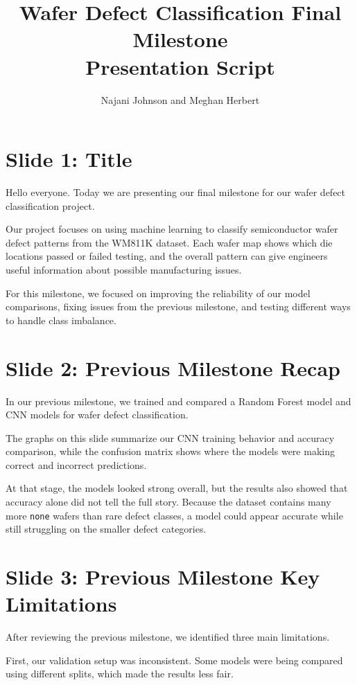 \documentclass[11pt]{article}
\title{Wafer Defect Classification Final Milestone\\Presentation Script}
\author{Najani Johnson and Meghan Herbert}
\date{}
\begin{document}
\maketitle

\section*{Slide 1: Title}

Hello everyone. Today we are presenting our final milestone for our wafer defect classification project.

Our project focuses on using machine learning to classify semiconductor wafer defect patterns from the WM811K dataset. Each wafer map shows which die locations passed or failed testing, and the overall pattern can give engineers useful information about possible manufacturing issues.

For this milestone, we focused on improving the reliability of our model comparisons, fixing issues from the previous milestone, and testing different ways to handle class imbalance.

\section*{Slide 2: Previous Milestone Recap}

In our previous milestone, we trained and compared a Random Forest model and CNN models for wafer defect classification.

The graphs on this slide summarize our CNN training behavior and accuracy comparison, while the confusion matrix shows where the models were making correct and incorrect predictions.

At that stage, the models looked strong overall, but the results also showed that accuracy alone did not tell the full story. Because the dataset contains many more \texttt{none} wafers than rare defect classes, a model could appear accurate while still struggling on the smaller defect categories.

\section*{Slide 3: Previous Milestone Key Limitations}

After reviewing the previous milestone, we identified three main limitations.

First, our validation setup was inconsistent. Some models were being compared using different splits, which made the results less fair.
\end{document}
